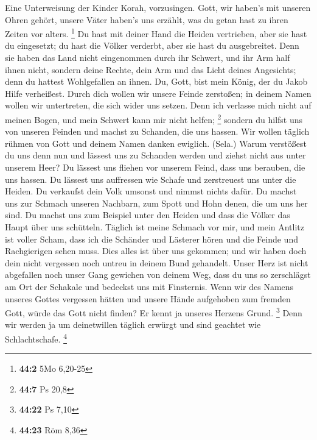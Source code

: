 Eine Unterweisung der Kinder Korah, vorzusingen.
 Gott, wir haben's mit unseren Ohren gehört, unsere Väter
haben's uns erzählt, was du getan hast zu ihren Zeiten vor alters.
\footnote{\textbf{44:2} 5Mo 6,20-25}  Du hast mit deiner
Hand die Heiden vertrieben, aber sie hast du eingesetzt; du hast die
Völker verderbt, aber sie hast du ausgebreitet.  Denn sie
haben das Land nicht eingenommen durch ihr Schwert, und ihr Arm half
ihnen nicht, sondern deine Rechte, dein Arm und das Licht deines
Angesichts; denn du hattest Wohlgefallen an ihnen.  Du,
Gott, bist mein König, der du Jakob Hilfe verheißest. 
Durch dich wollen wir unsere Feinde zerstoßen; in deinem Namen wollen
wir untertreten, die sich wider uns setzen.  Denn ich
verlasse mich nicht auf meinen Bogen, und mein Schwert kann mir nicht
helfen; \footnote{\textbf{44:7} Ps 20,8}  sondern du
hilfst uns von unseren Feinden und machst zu Schanden, die uns hassen.
 Wir wollen täglich rühmen von Gott und deinem Namen
danken ewiglich. (Sela.)  Warum verstößest du uns denn
nun und lässest uns zu Schanden werden und ziehst nicht aus unter
unserem Heer?  Du lässest uns fliehen vor unserem Feind,
dass uns berauben, die uns hassen.  Du lässest uns
auffressen wie Schafe und zerstreuest uns unter die Heiden.
 Du verkaufst dein Volk umsonst und nimmst nichts dafür.
 Du machst uns zur Schmach unseren Nachbarn, zum Spott
und Hohn denen, die um uns her sind.  Du machst uns zum
Beispiel unter den Heiden und dass die Völker das Haupt über uns
schütteln.  Täglich ist meine Schmach vor mir, und mein
Antlitz ist voller Scham,  dass ich die Schänder und
Lästerer hören und die Feinde und Rachgierigen sehen muss.
 Dies alles ist über uns gekommen; und wir haben doch
dein nicht vergessen noch untreu in deinem Bund gehandelt.
 Unser Herz ist nicht abgefallen noch unser Gang gewichen
von deinem Weg,  dass du uns so zerschlägst am Ort der
Schakale und bedeckst uns mit Finsternis.  Wenn wir des
Namens unseres Gottes vergessen hätten und unsere Hände aufgehoben zum
fremden Gott,  würde das Gott nicht finden? Er kennt ja
unseres Herzens Grund. \footnote{\textbf{44:22} Ps 7,10} 
Denn wir werden ja um deinetwillen täglich erwürgt und sind geachtet wie
Schlachtschafe. \footnote{\textbf{44:23} Röm 8,36} 

